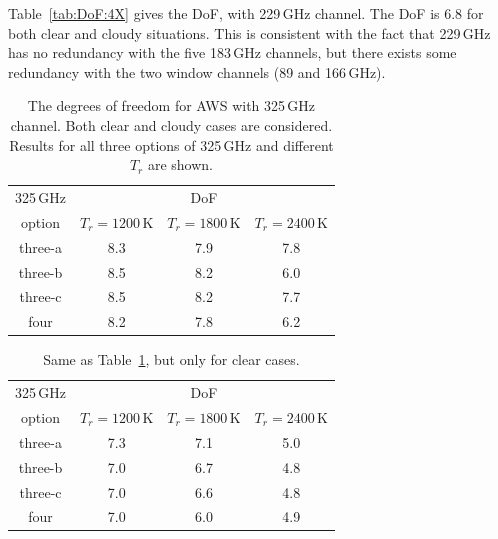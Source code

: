 \documentclass[12pt]{article}
\begin{document}
Table~\ref{tab:DoF:4X} gives the DoF, with 229\,GHz channel. The DoF is 6.8 for
both clear and cloudy situations. This is consistent with the fact that
229\,GHz has no redundancy with the five 183\,GHz channels, but there exists
some redundancy with the two window channels (89 and 166\,GHz).

\begin{table}[!p]
	\centering
	\begin{tabular}[b]{c|c|c|c}
		 325\,GHz & \multicolumn{3}{c}{DoF}   \\
		 option &  $T_r = 1200 $\,K &   $T_r = 1800 $\,K &   $T_r = 2400$\,K \\
		\hline
		three-a &              8.3 &              7.9 &              7.8 \\		
		three-b &              8.5 &              8.2 &              6.0 \\		
		three-c &              8.5 &              8.2 &              7.7 \\		
		four    &              8.2 &              7.8 &              6.2 \\
		\hline
	\end{tabular}
	\caption{The degrees of freedom for AWS with 325\,GHz channel. Both clear
      and cloudy cases are considered. Results for all three options of
      325\,GHz and different $T_r$ are shown. }
	\label{tab:DoF:all}
\end{table}

\begin{table}[!p]
	\centering
	\begin{tabular}[b]{c|c|c|c}
	325\,GHz & \multicolumn{3}{c}{DoF}   \\
	option &  $T_r = 1200 $\,K &   $T_r = 1800 $\,K &   $T_r = 2400$\,K \\
	\hline
		three-a &              7.3 &              7.1 &              5.0 \\		
		three-b &              7.0 &              6.7 &              4.8 \\		
		three-c &              7.0 &              6.6 &              4.8 \\		
		four    &              7.0 &              6.0 &              4.9 \\
	\hline
\end{tabular}
	\caption{Same as Table~\ref{tab:DoF:all}, but only for clear cases.}
\label{tab:DoF:clear}
\end{table}
\end{document}
